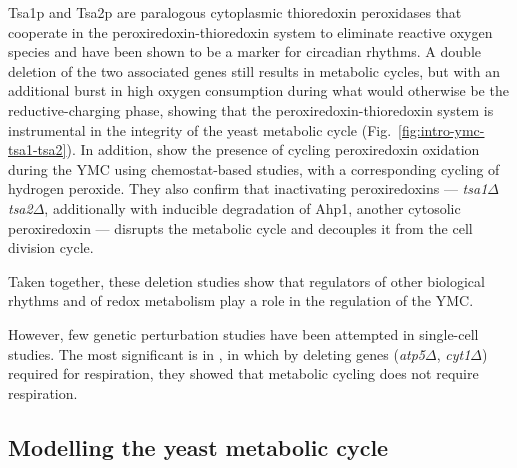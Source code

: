 Tsa1p and Tsa2p are paralogous cytoplasmic thioredoxin peroxidases that cooperate in the peroxiredoxin-thioredoxin system to eliminate reactive oxygen species and have been shown to be a marker for circadian rhythms.
A double deletion of the two associated genes still results in metabolic cycles, but with an additional burst in high oxygen consumption during what would otherwise be the reductive-charging phase, showing that the peroxiredoxin-thioredoxin system is instrumental in the integrity of the yeast metabolic cycle (Fig.\ \ref{fig:intro-ymc-tsa1-tsa2}).
In addition, \textcite{amponsahPeroxiredoxinsCoupleMetabolism2021} show the presence of cycling peroxiredoxin oxidation during the YMC using chemostat-based studies, with a corresponding cycling of hydrogen peroxide.
They also confirm that inactivating peroxiredoxins --- \textit{tsa1$\Delta$ tsa2$\Delta$}, additionally with inducible degradation of Ahp1, another cytosolic peroxiredoxin --- disrupts the metabolic cycle and decouples it from the cell division cycle.

Taken together, these deletion studies show that regulators of other biological rhythms and of redox metabolism play a role in the regulation of the YMC.

However, few genetic perturbation studies have been attempted in single-cell studies.
The most significant is in \textcite{baumgartnerFlavinbasedMetabolicCycles2018}, in which by deleting genes (\textit{atp5$\Delta$}, \textit{cyt1$\Delta$}) required for respiration, they showed that metabolic cycling does not require respiration.

\subsection{Modelling the yeast metabolic cycle}
\label{subsec:intro-ymc-model}


